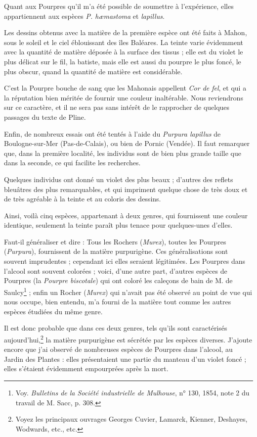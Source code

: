 \documentclass[a4paper, 11pt, oneside, polutonikogreek, french]{article}
\begin{document}
Quant aux Pourpres qu'il m'a été possible de soumettre à l'expérience, elles appartiennent aux espèces \emph{P. hæmastoma} et \emph{lapillus}.

Les dessins obtenus avec la matière de la première espèce ont été faits à Mahon, sous le soleil et le ciel éblouissant des îles Baléares. La teinte varie évidemment avec la quantité de matière déposée à la surface des tissus ; elle est du violet le plus délicat sur le fil, la batiste, mais elle est aussi du pourpre le plus foncé, le plus obscur, quand la quantité de matière est considérable.

C'est la Pourpre bouche de sang que les Mahonais appellent \emph{Cor de fel}, et qui a la réputation bien méritée de fournir une couleur inaltérable. Nous reviendrons sur ce caractère, et il ne sera pas sans intérêt de le rapprocher de quelques passages du texte de Pline.

Enfin, de nombreux essais ont été tentés à l'aide du \emph{Purpura lapillus} de Boulogne-sur-Mer (Pas-de-Calais), ou bien de Pornic (Vendée). Il faut remarquer que, dans la première localité, les individus sont de bien plus grande taille que dans la seconde, ce qui facilite les recherches.

Quelques individus ont donné un violet des plus beaux ; d'autres des reflets bleuâtres des plus remarquables, et qui impriment quelque chose de très doux et de très agréable à la teinte et au coloris des dessins.

Ainsi, voilà cinq espèces, appartenant à deux genres, qui fournissent une couleur identique, seulement la teinte paraît plus tenace pour quelques-unes d'elles.

Faut-il généraliser et dire : Tous les Rochers (\emph{Murex}), toutes les Pourpres (\emph{Purpura}), fournissent de la matière purpurigène. Ces généralisations sont souvent imprudentes ; cependant ici elles seraient légitimées. Les Pourpres dans l'alcool sont souvent colorées ; voici, d'une autre part, d'autres espèces de Pourpres (la \emph{Pourpre biscotale}) qui ont coloré les caleçons de bain de M. de Saulcy\footnote{Voy. \emph{Bulletins de la Société industrielle de Mulhouse}, n° 130, 1854, note 2 du travail de M. Sacc, p. 308.} ; enfin un Rocher (\emph{Murex}) qui n'avait pas été observé au point de vue qui nous occupe, bien entendu, m'a fourni de la matière tout comme les autres espèces étudiées du même genre.

Il est donc probable que dans ces deux genres, tels qu'ils sont caractérisés aujourd'hui,\footnote{Voyez les principaux ouvrages Georges Cuvier, Lamarck, Kienner, Deshayes, Wodwards, etc., etc.} la matière purpurigène est sécrétée par les espèces diverses. J'ajoute encore que j'ai observé de nombreuses espèces de Pourpres dans l'alcool, au Jardin des Plantes : elles présentaient une partie du manteau d'un violet foncé ; elles s'étaient évidemment empourprées après la mort.
\end{document}
